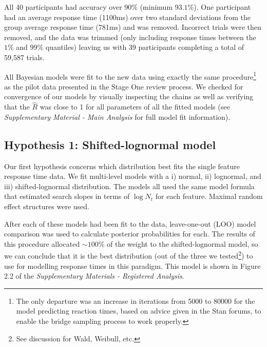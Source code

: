 \documentclass[preprint,12pt,authoryear]{elsarticle}
\begin{document}
All 40 participants had accuracy over $90\%$ (minimum $93.1\%$). One participant had an average response time (1100ms) over two standard deviations from the group average response time (781ms) and was removed. Incorrect trials were then removed, and the data was trimmed (only including response times between the $1\%$ and $99\%$ quantiles) leaving us with 39 participants completing a total of 59,587 trials.

All Bayesian models were fit to the new data using exactly the same procedure\footnote{The only departure was an increase in iterations from 5000 to 80000 for the model predicting reaction times, based on advice given in the Stan forums, to enable the bridge sampling process to work properly.} as the pilot data presented in the Stage One review process. We checked for convergence of our models by visually inspecting the chains as well as verifying that the $\hat{R}$ was close to 1 for all parameters of all the fitted models (see \textit{Supplementary Material - Main Analysis} for full model fit information).

\subsection{Hypothesis 1: Shifted-lognormal model}

Our first hypothesis concerns which distribution best fits the single feature response time data. We fit multi-level models with
a i) normal, ii) lognormal, and iii) shifted-lognormal distribution. The models all used the same model formula that estimated search slopes in terms of $\log{N_t}$ for each feature. Maximal random effect structures were used. 

After each of these models had been fit to the data, leave-one-out (LOO) model comparison was used to calculate posterior probabilities for each. The results of this procedure allocated $\sim100\%$ of the weight to the shifted-lognormal model, so we can conclude that it is the best distribution (out of the three we tested\footnote{See discussion for Wald, Weibull, etc.}) to use for modelling response times in this paradigm. This model is shown in Figure 2.2 of the \textit{Supplementary Materials - Registered Analysis}.

\end{document}
